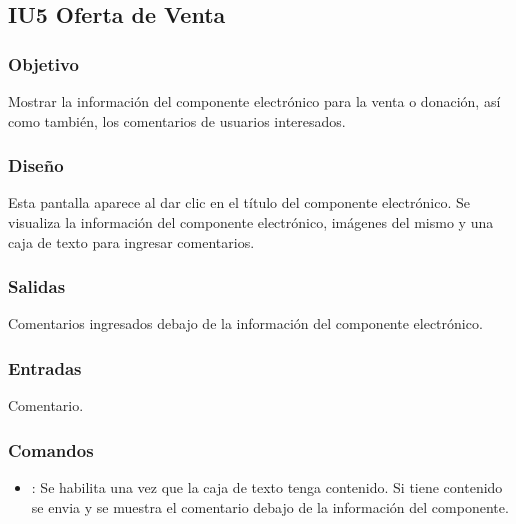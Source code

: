 \subsection{IU5 Oferta de Venta}

\subsubsection{Objetivo}
	Mostrar la información del componente electrónico para la venta o donación, así como también, los comentarios de usuarios interesados.
	
\subsubsection{Diseño}
	Esta pantalla aparece al dar clic en el título del componente electrónico. Se visualiza la información del componente electrónico, imágenes del mismo y una caja de texto para ingresar comentarios.


\subsubsection{Salidas}

	Comentarios ingresados debajo de la información del componente electrónico.

\subsubsection{Entradas}
Comentario.

\subsubsection{Comandos}
\begin{itemize}
	\item {}: Se habilita una vez que la caja de texto tenga contenido. Si tiene contenido se envia y se muestra el comentario debajo de la información del componente.
\end{itemize}

